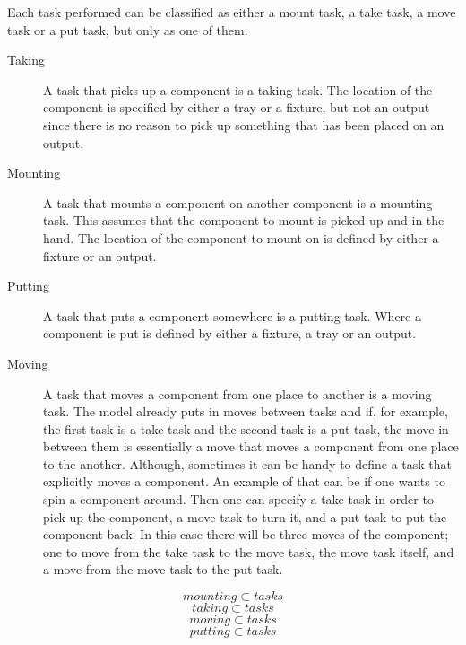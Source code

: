   Each task performed can be classified as either a mount task, a take task, a move task or a put task, but only as one of them.
  \begin{description}
  \item[Taking] A task that picks up a component is a taking task. The location of the component is specified by either a tray or a fixture, but not an output since there is no reason to pick up something that has been placed on an output.
  
  \item[Mounting] A task that mounts a component on another component is a mounting task. This assumes that the component to mount is picked up and in the hand. The location of the component to mount on is defined by either a fixture or an output.
  
  \item[Putting] A task that puts a component somewhere is a putting task. Where a component is put is defined by either a fixture, a tray or an output.
  
  \item[Moving] A task that moves a component from one place to another is a moving task. The model already puts in moves between tasks and if, for example, the first task is a take task and the second task is a put task, the move in between them is essentially a move that moves a component from one place to the another. Although, sometimes it can be handy to define a task that explicitly moves a component. An example of that can be if one wants to spin a component around. Then one can specify a take task in order to pick up the component, a move task to turn it, and a put task to put the component back. In this case there will be three moves of the component; one to move from the take task to the move task, the move task itself, and a move from the move task to the put task.
   \end{description}
 \begin{equation}\label{eq:26}
 mounting \subset tasks
 \end{equation}
 \begin{equation}\label{eq:27}
 taking \subset tasks
 \end{equation}
 \begin{equation}\label{eq:28}
 moving \subset tasks
 \end{equation}
 \begin{equation}\label{eq:29}
 putting \subset tasks
 \end{equation}

